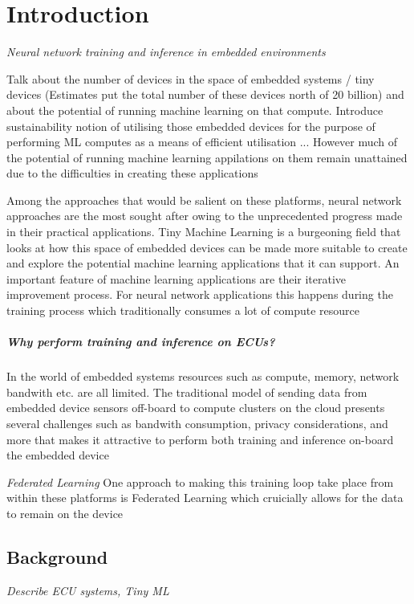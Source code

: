 \part{Introduction}

\textit{Neural network training and inference in embedded environments}

{\color{red}
	Talk about the number of devices in the space of embedded systems / tiny devices (Estimates put the total number of these devices north of 20 billion) and about the potential of running machine learning on that compute. Introduce sustainability notion of utilising those embedded devices for the purpose of performing ML computes as a means of efficient utilisation ... However  much of the potential of running machine learning appilations on them remain unattained due to the difficulties in creating these applications

	Among the approaches that would be salient on these platforms, neural network approaches are the most sought after owing to the unprecedented progress made in their practical applications. Tiny Machine Learning is a burgeoning field that looks at how this space of embedded devices can be made more suitable to create and explore the potential machine learning applications that it can support. An important feature of machine learning applications are their iterative improvement process. For neural network applications this happens during the training process which traditionally consumes a lot of compute resource

}

\subsubsection{Why perform training and inference on ECUs?}

In the world of embedded systems resources such as compute, memory, network bandwith etc. are all limited. The traditional model of sending data from embedded device sensors off-board to compute clusters on the cloud presents several challenges such as bandwith consumption, privacy considerations, and more that makes it attractive to perform both training and inference on-board the embedded device

{\color{red}
	\textit{Federated Learning}
One approach to making this training loop take place from within these platforms is Federated Learning which cruicially allows for the data to remain on the device
}

\chapter{Background}
\textit{Describe ECU systems, Tiny ML}

